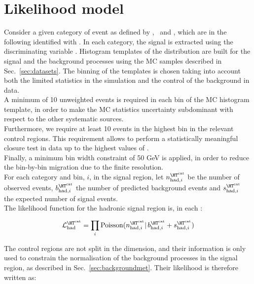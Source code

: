 \section{Likelihood model}
\label{sec:likelihood}

Consider a given category of event as defined by \njet, \nb~and \scalht, which are in the following identified with \htcat. 
In each category, the signal is extracted using the discriminating variable \mht. 
Histogram templates of the \mht distribution are built for the signal and the background processes 
using the MC samples described in Sec.~\ref{sec:datasets}. 
The binning of the templates is chosen taking into account both the limited statistics in the simulation and 
the control of the background in data. \\
A minimum of 10 unweighted events is required in each bin of the MC histogram template, 
in order to make the MC statistics uncertainty subdominant with respect to the other systematic sources. \\
Furthermore, we require at least 10 events in the highest bin in the relevant control regions.
This requirement allows to perform a statistically meaningful closure test in data up to the highest values of \mht.\\
Finally, a minimum bin width constraint of 50 GeV is applied, 
in order to reduce the bin-by-bin migration due to the finite \mht resolution.\\


For each category \htcat and \mht bin, $i$, in the signal region, let $n^{\htcat}_{\mathrm{had},i}$ be the number of observed events, $b^{\htcat}_{\mathrm{had},i}$ the number of predicted background events and $s^{\htcat}_{\mathrm{had},i}$ the expected number of signal events. \\
The likelihood function for the hadronic signal region is, in each \htcat:

\begin{equation}
\mathcal{L}^{\htcat}_{\mathrm{had}}=\prod_i \mathrm{Poisson}(n^{\htcat}_{\mathrm{had},i} |\, b^{\htcat}_{\mathrm{had},i} + s^{\htcat}_{\mathrm{had},i})
\label{eq:hadronicLikelihood}
\end{equation}

The control regions are not split in the \mht dimension, and their information is only used to constrain the normalisation of the background processes 
in the signal region, as described in Sec.~\ref{sec:backgroundmet}. 
Their likelihood is therefore written as:

